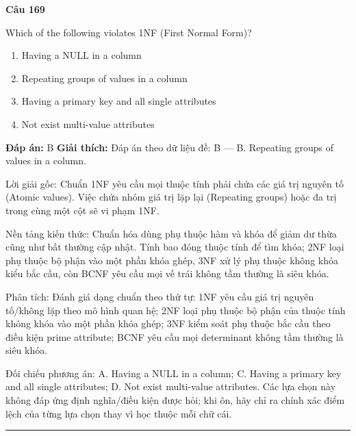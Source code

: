\documentclass[11pt,a4paper]{article}
\newenvironment{question}[1]{%
  \par\vspace{1em}\noindent\textbf{\large Câu #1}\par\vspace{0.4em}
}{%
  \par\vspace{1em}\hrule\vspace{0.6em}
}
\newenvironment{choices}{%
  \begin{enumerate}[label=\textbf{\Alph*.},leftmargin=2.2em,itemsep=2pt,topsep=3pt]
}{%
  \end{enumerate}
}
\newcommand{\choice}{\item}
\begin{document}
\begin{question}{169}
Which of the following violates 1NF (First Normal Form)?
\begin{choices}
\choice Having a NULL in a column
\choice Repeating groups of values in a column
\choice Having a primary key and all single attributes
\choice Not exist multi-value attributes
\end{choices}
\textbf{Đáp án:} B
\textbf{Giải thích:} Đáp án theo dữ liệu đề: B — B. Repeating groups of values in a column.

Lời giải gốc: Chuẩn 1NF yêu cầu mọi thuộc tính phải chứa các giá trị nguyên tố (Atomic values). Việc chứa nhóm giá trị lặp lại (Repeating groups) hoặc đa trị trong cùng một cột sẽ vi phạm 1NF.

Nền tảng kiến thức: Chuẩn hóa dùng phụ thuộc hàm và khóa để giảm dư thừa cũng như bất thường cập nhật. Tính bao đóng thuộc tính để tìm khóa; 2NF loại phụ thuộc bộ phận vào một phần khóa ghép, 3NF xử lý phụ thuộc không khóa kiểu bắc cầu, còn BCNF yêu cầu mọi vế trái không tầm thường là siêu khóa.

Phân tích: Đánh giá dạng chuẩn theo thứ tự: 1NF yêu cầu giá trị nguyên tố/không lặp theo mô hình quan hệ; 2NF loại phụ thuộc bộ phận của thuộc tính không khóa vào một phần khóa ghép; 3NF kiểm soát phụ thuộc bắc cầu theo điều kiện prime attribute; BCNF yêu cầu mọi determinant không tầm thường là siêu khóa.

Đối chiếu phương án: A. Having a NULL in a column; C. Having a primary key and all single attributes; D. Not exist multi-value attributes. Các lựa chọn này không đáp ứng định nghĩa/điều kiện được hỏi; khi ôn, hãy chỉ ra chính xác điểm lệch của từng lựa chọn thay vì học thuộc mỗi chữ cái.
\end{question}
\end{document}
